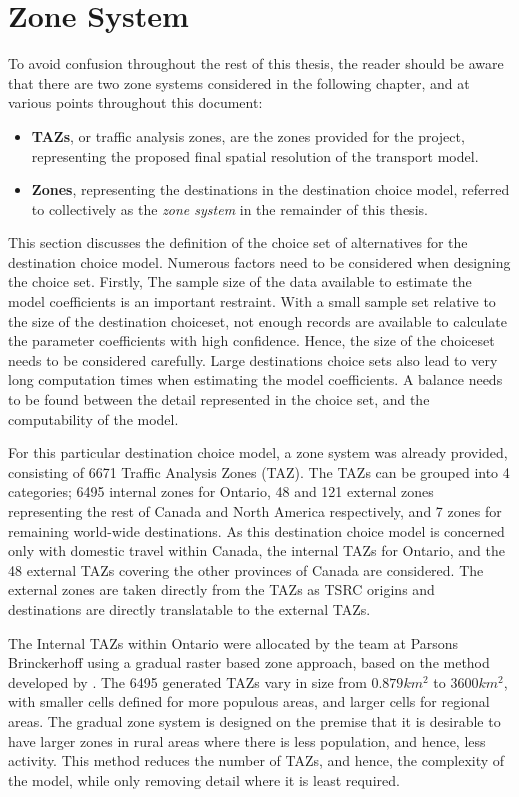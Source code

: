 \section{Zone System}
To avoid confusion throughout the rest of this thesis, the reader should be aware that there are two zone systems considered in the following chapter, and at various points throughout this document:
\begin{itemize}
\item \textbf{TAZs}, or traffic analysis zones, are the zones provided for the project, representing the proposed final spatial resolution of the transport model.
\item \textbf{Zones}, representing the destinations in the destination choice model, referred to collectively as the \textit{zone system} in the remainder of this thesis.  
\end{itemize}

This section discusses the definition of the choice set of alternatives for the destination choice model. Numerous factors need to be considered when designing the choice set. Firstly, The sample size of the data available to estimate the model coefficients is an important restraint. With a small sample set relative to the size of the destination choiceset, not enough records are available to calculate the parameter coefficients with high confidence. Hence, the size of the choiceset needs to be considered carefully. Large destinations choice sets also lead to very long computation times when estimating the model coefficients. A balance needs to be found between the detail represented in the choice set, and the computability of the model.

For this particular destination choice model, a zone system was already provided, consisting of 6671 Traffic Analysis Zones (TAZ). The TAZs can be grouped into 4 categories; 6495 internal zones for Ontario, 48 and 121 external zones representing the rest of Canada and North America respectively, and 7 zones for remaining world-wide destinations. As this destination choice model is concerned only with domestic travel within Canada, the internal TAZs for Ontario, and the 48 external TAZs covering the other provinces of Canada are considered. The external zones are taken directly from the TAZs as TSRC origins and destinations are directly translatable to the external TAZs.

The Internal TAZs within Ontario were allocated by the team at Parsons Brinckerhoff using a gradual raster based zone approach, based on the method developed by \textcite{moeckel2015gradual}. The 6495 generated TAZs vary in size from $0.879 km^2$ to $3600km^2$, with smaller cells defined for more populous areas, and larger cells for regional areas. The gradual zone system is designed on the premise that it is desirable to have larger zones in rural areas where there is less population, and hence, less activity. This method reduces the number of TAZs, and hence, the complexity of the model, while only removing detail where it is least required. 

